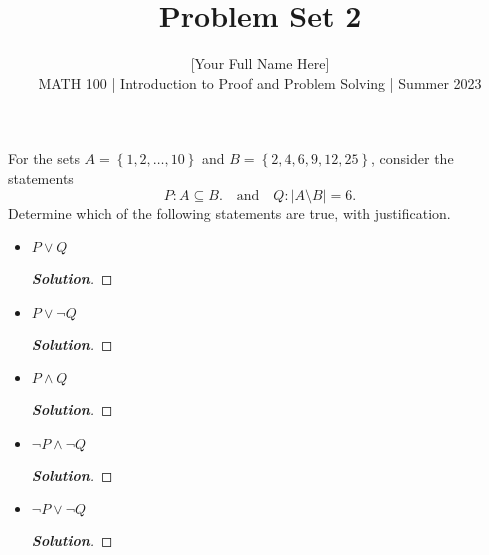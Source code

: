 \documentclass[11pt]{article}
\newenvironment{problem}[2][Problem\!]{\begin{trivlist}
\item[\hskip \labelsep {\bfseries #1}\hskip \labelsep {\bfseries #2.}]}{\end{trivlist}}
\newenvironment{solution}{\begin{proof}[\textbf{\textit{Solution}}]}{\end{proof}}
\newcommand{\abs}[1]{\left\lvert#1\right\rvert} %
\newcommand{\set}[1]{\left\{#1\right\}} %
\begin{document}
 
\title{Problem Set 2}
\author{[Your Full Name Here]\\[0.5em]
MATH 100 | Introduction to Proof and Problem Solving | Summer 2023}
\date{} 
\maketitle


\begin{problem}{2.1}
For the sets $A = \set{1, 2,\ldots,10}$ and $B = \set{2, 4, 6, 9, 12, 25}$, consider the statements
\[P: A \subseteq B. \quad \text{and} \quad Q: \abs{A \setminus B} = 6.\]
Determine which of the following statements are true, with justification.
\begin{itemize}[itemsep=3em]
\item[(a)] $P \lor Q$
\begin{solution}
\end{solution}

\item[(b)] $P \lor \neg Q$
\begin{solution}
\end{solution}

\item[(c)] $P \land Q$
\begin{solution}
\end{solution}

\item[(d)] $\neg P \land \neg Q$
\begin{solution}
\end{solution}

\item[(e)] $\neg P \lor \neg Q$
\begin{solution}
\end{solution}

\end{itemize}
\end{problem}
\end{document}

